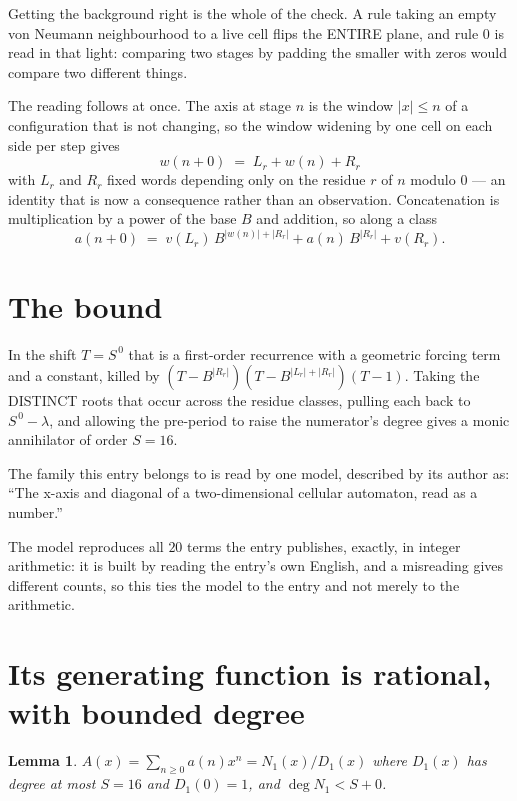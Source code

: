 \documentclass[11pt,a4paper]{article}
\theoremstyle{plain}
\newtheorem{lemma}[theorem]{Lemma}
\theoremstyle{definition}
\begin{document}
Getting the background right is the whole of the check. A rule taking an empty von Neumann
neighbourhood to a live cell flips the ENTIRE plane, and rule 0 is read
in that light: comparing two stages by padding the smaller with zeros would compare two
different things.

The reading follows at once. The axis at stage $n$ is the window $|x|\le n$ of a configuration
that is not changing, so the window widening by one cell on each side per step gives
\[
w(n+0)\;=\;L_r + w(n) + R_r
\]
with $L_r$ and $R_r$ fixed words depending only on the residue $r$ of $n$ modulo $0$ --- an
identity that is now a consequence rather than an observation. Concatenation is multiplication
by a power of the base $B$ and addition, so along a class
\[
a(n+0)\;=\;v(L_r)\,B^{|w(n)|+|R_r|} + a(n)\,B^{|R_r|} + v(R_r).
\]

\section{The bound}

In the shift $T=S^{\,0}$ that is a first-order recurrence with a geometric forcing term and a
constant, killed by $(T-B^{|R_r|})(T-B^{|L_r|+|R_r|})(T-1)$. Taking the DISTINCT roots that
occur across the residue classes, pulling each back to $S^{\,0}-\lambda$, and allowing the
pre-period to raise the numerator's degree gives a monic annihilator of order $S=16$.

The family this entry belongs to is read by one model, described by its author as: ``The x-axis and diagonal of a two-dimensional cellular automaton, read as a number.''


The model reproduces all $20$ terms the entry publishes, exactly, in integer arithmetic:
it is built by reading the entry's own English, and a misreading gives different counts, so
this ties the model to the entry and not merely to the arithmetic.

\section{Its generating function is rational, with bounded degree}

\begin{lemma}\label{lem:rat}
$A(x)=\sum_{n\ge0}a(n)x^n=N_1(x)/D_1(x)$ where $D_1(x)$ has degree at most $S=16$ and
$D_1(0)=1$, and $\deg N_1<S+0$.
\end{lemma}
\end{document}
